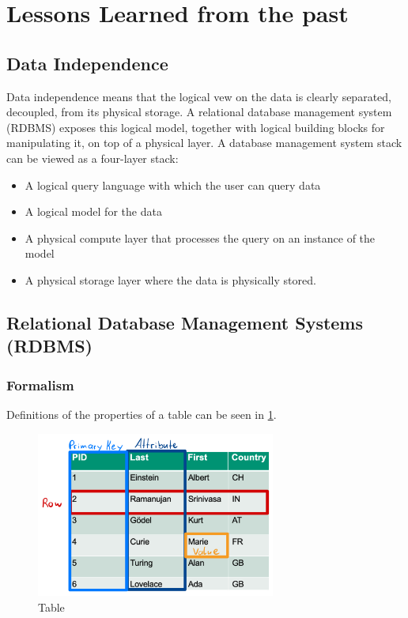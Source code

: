 \section{Lessons Learned from the past}

\subsection{Data Independence}

Data independence means that the logical vew on the data is clearly separated, decoupled, from its physical storage. A relational database management system (RDBMS) exposes this logical model, together with logical building blocks for manipulating it, on top of a physical layer. A database management system stack can be viewed as a four-layer stack:
\begin{itemize}
    \item A logical query language with which the user can query data
    \item A logical model for the data
    \item A physical compute layer that processes the query on an instance of the model
    \item A physical storage layer where the data is physically stored.
\end{itemize}

\subsection{Relational Database Management Systems (RDBMS)}

\subsubsection{Formalism}

Definitions of the properties of a table can be seen in \cref{fig:table}.

\begin{figure}[h]
    \centering
    \includegraphics[width=0.7\textwidth]{Figures/Tables.jpeg}
    \caption{Table}\label{fig:table}
\end{figure}

